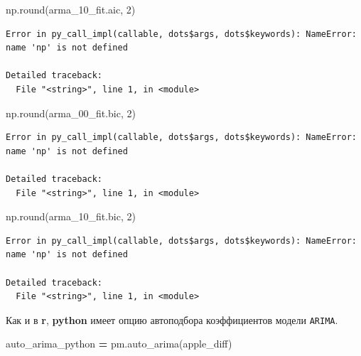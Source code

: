 \documentclass[]{book}
\newenvironment{Shaded}{\begin{snugshade}}{\end{snugshade}}
\newcommand{\BuiltInTok}[1]{#1}
\newcommand{\DecValTok}[1]{\textcolor[rgb]{0.00,0.00,0.81}{#1}}
\newcommand{\NormalTok}[1]{#1}
\newcommand{\OperatorTok}[1]{\textcolor[rgb]{0.81,0.36,0.00}{\textbf{#1}}}
\begin{document}
\begin{Shaded}
\begin{Highlighting}[]
\NormalTok{np.}\BuiltInTok{round}\NormalTok{(arma_10_fit.aic, }\DecValTok{2}\NormalTok{)}
\end{Highlighting}
\end{Shaded}

\begin{verbatim}
Error in py_call_impl(callable, dots$args, dots$keywords): NameError: name 'np' is not defined

Detailed traceback: 
  File "<string>", line 1, in <module>
\end{verbatim}

\begin{Shaded}
\begin{Highlighting}[]
\NormalTok{np.}\BuiltInTok{round}\NormalTok{(arma_00_fit.bic, }\DecValTok{2}\NormalTok{)}
\end{Highlighting}
\end{Shaded}

\begin{verbatim}
Error in py_call_impl(callable, dots$args, dots$keywords): NameError: name 'np' is not defined

Detailed traceback: 
  File "<string>", line 1, in <module>
\end{verbatim}

\begin{Shaded}
\begin{Highlighting}[]
\NormalTok{np.}\BuiltInTok{round}\NormalTok{(arma_10_fit.bic, }\DecValTok{2}\NormalTok{)}
\end{Highlighting}
\end{Shaded}

\begin{verbatim}
Error in py_call_impl(callable, dots$args, dots$keywords): NameError: name 'np' is not defined

Detailed traceback: 
  File "<string>", line 1, in <module>
\end{verbatim}

Как и в \textbf{r}, \textbf{python} имеет опцию автоподбора коэффициентов модели \texttt{ARIMA}.

\begin{Shaded}
\begin{Highlighting}[]
\NormalTok{auto_arima_python }\OperatorTok{=}\NormalTok{ pm.auto_arima(apple_diff)}
\end{Highlighting}
\end{Shaded}
\end{document}
